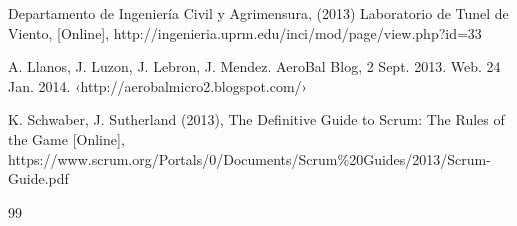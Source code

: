 \begin{thebibliography}{99}
	Departamento de Ingeniería Civil y Agrimensura, (2013) Laboratorio de Tunel de
	Viento, [Online], http://ingenieria.uprm.edu/inci/mod/page/view.php?id=33

	A. Llanos, J. Luzon, J. Lebron, J. Mendez. AeroBal Blog, 2 Sept. 2013. Web. 24 Jan. 2014.
	‹http://aerobalmicro2.blogspot.com/›

	K. Schwaber, J. Sutherland (2013), The Definitive Guide to Scrum: The Rules of the Game [Online],
	https://www.scrum.org/Portals/0/Documents/Scrum\%20Guides/2013/Scrum-Guide.pdf

\end{thebibliography}{99}